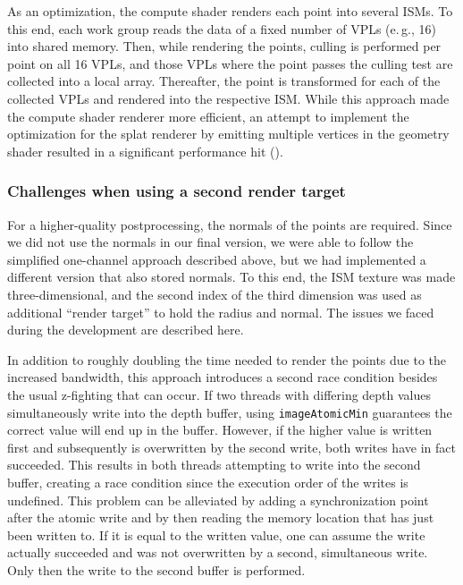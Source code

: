 As an optimization, the compute shader renders each point into several ISMs. To this end, each work group reads the data of a fixed number of VPLs (e.\,g., 16) into shared memory. Then, while rendering the points, culling is performed per point on all 16 VPLs, and those VPLs where the point passes the culling test are collected into a local array. Thereafter, the point is transformed for each of the collected VPLs and rendered into the respective ISM. While this approach made the compute shader renderer more efficient, an attempt to implement the optimization for the splat renderer by emitting multiple vertices in the geometry shader resulted in a significant performance hit ().


\subsubsection{Challenges when using a second render target}
\label{sec:impl:raceCondition}

For a higher-quality postprocessing, the normals of the points are required. Since we did not use the normals in our final version, we were able to follow the simplified one-channel approach described above, but we had implemented a different version that also stored normals. To this end, the ISM texture was made three-dimensional, and the second index of the third dimension was used as additional ``render target'' to hold the radius and normal. The issues we faced during the development are described here.

In addition to roughly doubling the time needed to render the points due to the increased bandwidth, this approach introduces a second race condition besides the usual z-fighting that can occur. If two threads with differing depth values simultaneously write into the depth buffer, using \texttt{imageAtomicMin} guarantees the correct value will end up in the buffer. However, if the higher value is written first and subsequently is overwritten by the second write, both writes have in fact succeeded. This results in both threads attempting to write into the second buffer, creating a race condition since the execution order of the writes is undefined. This problem can be alleviated by adding a synchronization point after the atomic write and by then reading the memory location that has just been written to. If it is equal to the written value, one can assume the write actually succeeded and was not overwritten by a second, simultaneous write. Only then the write to the second buffer is performed.

